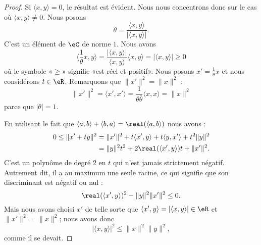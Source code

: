\begin{proof}
	Si \( \langle x, y\rangle =0\), le résultat est évident. Nous nous concentrons donc sur le cas où \( \langle x, y\rangle \neq0\). Nous posons
	\begin{equation}
		\theta=\frac{ \langle x, y\rangle  }{ | \langle x, y\rangle  | }.
	\end{equation}
	C'est un élément de \( \eC\) de norme \( 1\). Nous avons
	\begin{equation}
		\langle \frac{1}{ \theta }x, y\rangle =\frac{ | \langle x, y\rangle  | }{ \langle x, y\rangle  }\langle x, y\rangle =| \langle x, y\rangle  |\geq 0
	\end{equation}
	où le symbole «\( \geq\)» signifie «est réel et positif». Nous posons \( x'=\frac{1}{ \theta }x\) et nous considérons \( t\in \eR\). Remarquons que \( \| x' \|^2=\| x \|^2\) :
	\begin{equation}
		\| x' \|^2=\langle x', x'\rangle =\frac{1}{ \theta\bar\theta }\langle x, x\rangle =\| x \|^2
	\end{equation}
	parce que \( | \theta |=1\).

	En utilisant le fait que \( \langle a, b\rangle +\langle b, a\rangle =\real(\langle a, b\rangle )\) nous avons :
	\begin{subequations}
		\begin{align}
			0\leq \| x'+ty \|^2 & =\| x' \|^2+t\langle x', y\rangle +t\langle y, x'\rangle +t^2\| y \|^2 \\
			                    & =\| y \|^2t^2+2\real(\langle x', y\rangle )t+\| x' \|^2.
		\end{align}
	\end{subequations}
	C'est un polynôme de degré \( 2\) en \( t\) qui n'est jamais strictement négatif. Autrement dit, il a au maximum une seule racine, ce qui signifie que son discriminant est négatif ou nul :
	\begin{equation}
		\real(\langle x', y\rangle )^2-\| y \|^2\| x' \|^2\leq 0.
	\end{equation}
	Mais nous avons choisi \( x'\) de telle sorte que \( \langle x', y\rangle =| \langle x, y\rangle  |\in \eR\) et \( \| x' \|^2=\| x \|^2\); nous avons donc
	\begin{equation}
		| \langle x, y\rangle  |^2\leq \| x \|^2\| y \|^2,
	\end{equation}
	comme il se devait.
\end{proof}

